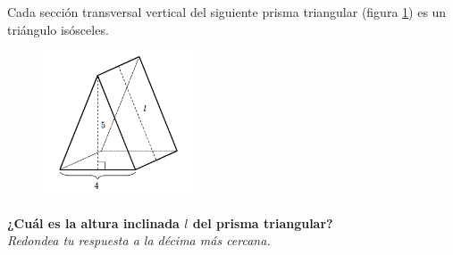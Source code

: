 \question[15]  Cada sección transversal vertical del siguiente prisma triangular (figura \ref{fig:pitagoras3D_pris_02}) es un triángulo isósceles.
\begin{figure}[H]
    \begin{center}
        \includegraphics[width=0.4\textwidth]{../images/pitagoras3D_pris_02.png}
    \end{center}
    \caption{}
    \label{fig:pitagoras3D_pris_02}
\end{figure}
\textbf{¿Cuál es la altura inclinada $l$ del prisma triangular?}\\
\textit{Redondea tu respuesta a la décima más cercana.}